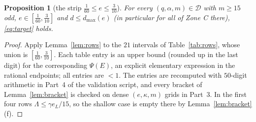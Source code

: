 \documentclass[11pt]{amsart}
\newtheorem{proposition}[theorem]{Proposition}
\newcommand{\D}{\mathcal D}
\begin{document}
\begin{proposition}[the strip $\tfrac1{60}\le e\le\tfrac3{10}$]
\label{prop:strip}
For every $(q,\alpha,m)\in\D$ with $m\ge15$ odd,
$e\in[\tfrac1{60},\tfrac3{10}]$ and $d\le d_{\max}(e)$ (in particular for
all of Zone C there), \eqref{eq:target} holds.
\end{proposition}

\begin{proof}
Apply Lemma~\ref{lem:rows} to the $21$ intervals of
Table~\ref{tab:rows}, whose union is $[\tfrac1{60},\tfrac3{10}]$.  Each
table entry is an upper bound (rounded up in the last digit) for the
corresponding $\Psi(E)$, an explicit elementary expression in the rational
endpoints; all entries are $<1$.  The entries are recomputed with $50$-digit
arithmetic in Part~4 of the validation script, and every bracket of
Lemma~\ref{lem:bracket} is checked on dense $(e,\kappa,m)$ grids in Part~3.
In the first four rows $\Lambda\le\gamma e_L/15$, so the shallow case is
empty there by Lemma~\ref{lem:bracket}(f).
\end{proof}
\end{document}
